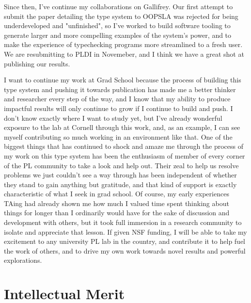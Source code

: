 \documentclass{nsf-grfp}
\begin{document}
Since then, I've continue my collaborations on Gallifrey. Our first attempt to submit the paper detailing the type system to OOPSLA was rejected for being underdeveloped and "unfinished", so I've worked to build software tooling to generate larger and more compelling examples of the system's power, and to make the experience of typechecking programs more streamlined to a fresh user. We are resubmitting to PLDI in Novemeber, and I think we have a great shot at publishing our results. 

I want to continue my work at Grad School because the process of building this type system and pushing it towards publication has made me a better thinker and researcher every step of the way, and I know that my ability to produce impactful results will only continue to grow if I continue to build and push. I don't know exactly where I want to study yet, but I've already wonderful exposure to the lab at Cornell through this work, and, as an example, I can see myself contributing so much working in an environment like that. One of the biggest things that has continued to shock and amaze me through the process of my work on this type system has been the enthusiasm of member of every corner of the PL community to take a look and help out. Their zeal to help us resolve problems we just couldn't see a way through has been independent of whether they stand to gain anything but gratitude, and that kind of support is exactly characteristic of what I seek in grad school. Of course, my early experiences TAing had already shown me how much I valued time spent thinking about things for longer than I ordinarily would have for the sake of discussion and development with others, but it took full immersion in a research community to isolate and appreciate that lesson. If given NSF funding, I will be able to take my excitement to any university PL lab in the country, and contribute it to help fuel the work of others, and to drive my own work towards novel results and powerful explorations. 

\section*{Intellectual Merit}
\end{document}
